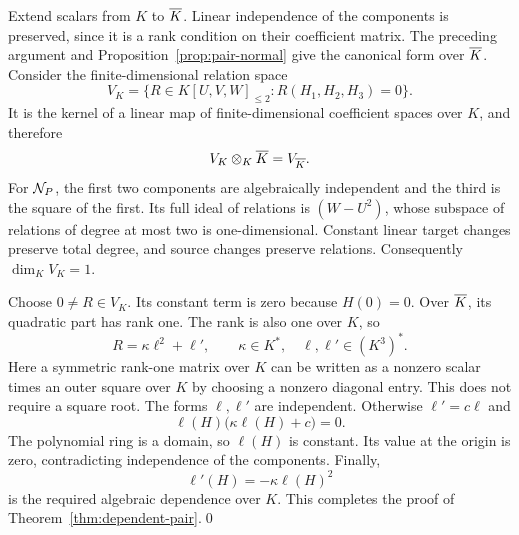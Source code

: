 Extend scalars from $K$ to $\overline K$. Linear independence of the components is preserved, since it is a rank condition on their coefficient matrix. The preceding argument and Proposition~\ref{prop:pair-normal} give the canonical form over $\overline K$. Consider the finite-dimensional relation space
\begin{equation}\label{eq:relation-space}
 V_K=\{R\in K[U,V,W]_{\leq2}:R(H_1,H_2,H_3)=0\}.
\end{equation}
It is the kernel of a linear map of finite-dimensional coefficient spaces over $K$, and therefore
\[
 V_K\otimes_K\overline K=V_{\overline K}.
\]
For $\mathcal N_P$, the first two components are algebraically independent and the third is the square of the first. Its full ideal of relations is $(W-U^2)$, whose subspace of relations of degree at most two is one-dimensional. Constant linear target changes preserve total degree, and source changes preserve relations. Consequently $\dim_KV_K=1$.

Choose $0\neq R\in V_K$. Its constant term is zero because $H(0)=0$. Over $\overline K$, its quadratic part has rank one. The rank is also one over $K$, so
\[
 R=\kappa\ell^2+\ell',\qquad \kappa\in K^*,\quad \ell,\ell'\in(K^3)^*.
\]
Here a symmetric rank-one matrix over $K$ can be written as a nonzero scalar times an outer square over $K$ by choosing a nonzero diagonal entry. This does not require a square root. The forms $\ell,\ell'$ are independent. Otherwise $\ell'=c\ell$ and
\[
 \ell(H)\bigl(\kappa\ell(H)+c\bigr)=0.
\]
The polynomial ring is a domain, so $\ell(H)$ is constant. Its value at the origin is zero, contradicting independence of the components. Finally,
\[
 \ell'(H)=-\kappa\ell(H)^2
\]
is the required algebraic dependence over $K$. This completes the proof of Theorem~\ref{thm:dependent-pair}.\qed
